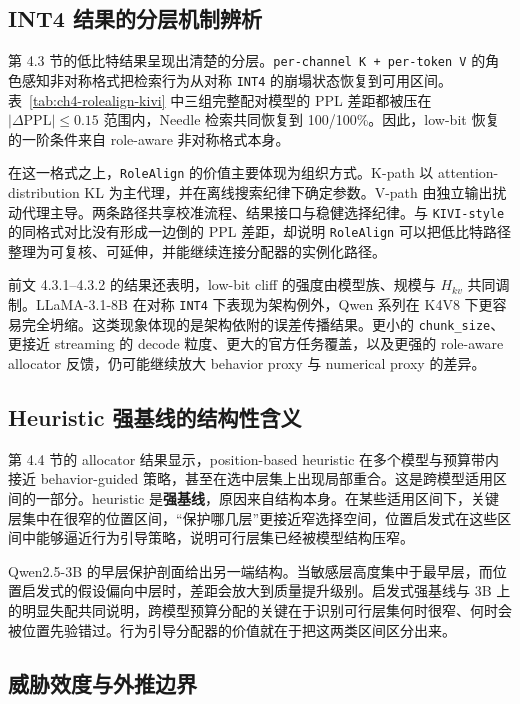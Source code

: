 \subsection{INT4 结果的分层机制辨析}
\label{subsec:ch4-disc-int4}
\label{subsec:exp-int4-honest}

第 4.3 节的低比特结果呈现出清楚的分层。\texttt{per-channel K + per-token V} 的角色感知非对称格式把检索行为从对称 \texttt{INT4} 的崩塌状态恢复到可用区间。表~\ref{tab:ch4-rolealign-kivi} 中三组完整配对模型的 PPL 差距都被压在 $|{\Delta}\mathrm{PPL}|\le 0.15$ 范围内，Needle 检索共同恢复到 100/100\%。因此，low-bit 恢复的一阶条件来自 role-aware 非对称格式本身。

在这一格式之上，\texttt{RoleAlign} 的价值主要体现为组织方式。K-path 以 attention-distribution KL 为主代理，并在离线搜索纪律下确定参数。V-path 由独立输出扰动代理主导。两条路径共享校准流程、结果接口与稳健选择纪律。与 \texttt{KIVI-style} 的同格式对比没有形成一边倒的 PPL 差距，却说明 \texttt{RoleAlign} 可以把低比特路径整理为可复核、可延伸，并能继续连接分配器的实例化路径。

前文 4.3.1–4.3.2 的结果还表明，low-bit cliff 的强度由模型族、规模与 $H_{kv}$ 共同调制。LLaMA-3.1-8B 在对称 \texttt{INT4} 下表现为架构例外，Qwen 系列在 K4V8 下更容易完全坍缩。这类现象体现的是架构依附的误差传播结果。更小的 \texttt{chunk\_size}、更接近 streaming 的 decode 粒度、更大的官方任务覆盖，以及更强的 role-aware allocator 反馈，仍可能继续放大 behavior proxy 与 numerical proxy 的差异。

\subsection{Heuristic 强基线的结构性含义}
\label{subsec:ch4-disc-heuristic}

第 4.4 节的 allocator 结果显示，position-based heuristic 在多个模型与预算带内接近 behavior-guided 策略，甚至在选中层集上出现局部重合。这是跨模型适用区间的一部分。heuristic 是\textbf{强基线}，原因来自结构本身。在某些适用区间下，关键层集中在很窄的位置区间，“保护哪几层”更接近窄选择空间，位置启发式在这些区间中能够逼近行为引导策略，说明可行层集已经被模型结构压窄。

Qwen2.5-3B 的早层保护剖面给出另一端结构。当敏感层高度集中于最早层，而位置启发式的假设偏向中层时，差距会放大到质量提升级别。启发式强基线与 3B 上的明显失配共同说明，跨模型预算分配的关键在于识别可行层集何时很窄、何时会被位置先验错过。行为引导分配器的价值就在于把这两类区间区分出来。

\subsection{威胁效度与外推边界}
\label{subsec:ch4-disc-validity}

